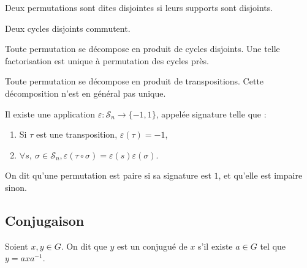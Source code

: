 \begin{defi}
 
Deux permutations sont dites disjointes si leurs supports sont disjoints.
\end{defi}

\begin{lemm}
 
Deux cycles disjoints commutent.
\end{lemm}

\begin{theo}
 
Toute permutation se décompose en produit de cycles disjoints. Une telle
factorisation est unique à permutation des cycles près.
\end{theo}

\begin{coro}
 
Toute permutation se décompose en produit de transpositions. Cette
décomposition n'est en général pas unique.
\end{coro}

\begin{defitheo}
 
Il existe une application $\varepsilon : \mathcal{S}_n \longrightarrow
\{-1,1\}$,
appelée signature telle que :
\begin{enumerate}
 \item Si $\tau$ est une transposition, $\varepsilon(\tau) = -1$,
 \item $\forall s,\ \sigma \in \mathcal{S}_n,
\varepsilon(\tau \circ \sigma) = \varepsilon(s)\varepsilon(\sigma)$.
\end{enumerate}

On dit qu'une permutation est paire si sa signature est $1$, et qu'elle est
impaire sinon.
\end{defitheo}


\subsection{Conjugaison}
\vspace{0.5em}

\begin{defi}[Conjugué de $x$]

 Soient $x,y \in G$. On dit que $y$ est un conjugué de $x$ s'il existe $a \in
G$ tel que $y = axa^{-1}$.
\end{defi}

